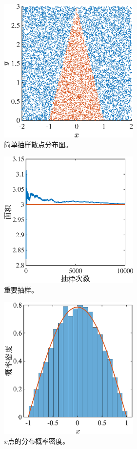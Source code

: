 \documentclass[12pt]{article}
\begin{document}
\begin{figure}[htp]
	\centering
	\includegraphics[width=7cm]{2.eps}
	\caption{简单抽样散点分布图。}
	\label{fig:2}
\end{figure}


\begin{figure}[htp]
	\centering
	\includegraphics[width=7cm]{3.eps}
	\caption{重要抽样。}
	\label{fig:3}
\end{figure}


\begin{figure}[htp]
	\centering
	\includegraphics[width=7cm]{4.eps}
	\caption{$x$点的分布概率密度。}
	\label{fig:4}
\end{figure}
\end{document}
